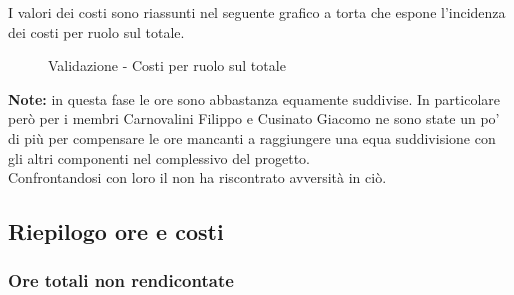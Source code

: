 				\noindent
				I valori dei costi sono riassunti nel seguente grafico a torta che espone l’incidenza dei costi per ruolo sul totale.
				\begin{center}
					\begin{figure}[htbp]
					\vspace{0.8cm}
					\caption{Validazione - Costi per ruolo sul totale}
					\end{figure}
				\end{center}
		\noindent
		\textbf{Note:} in questa fase le ore sono abbastanza equamente suddivise. In particolare però per i membri Carnovalini Filippo e Cusinato Giacomo ne sono state un po' di più per compensare le ore mancanti a raggiungere una equa suddivisione con gli altri componenti nel complessivo del progetto. \\
		Confrontandosi con loro il \roleProjectManager{} non ha riscontrato avversità in ciò.
	
	\newpage
	\subsection{Riepilogo ore e costi} %
	\label{sub:riepilogo_ore_e_costi}
			
		\subsubsection{Ore totali non rendicontate} %
		\label{ssub:ore_totali_non_rendicontate}
